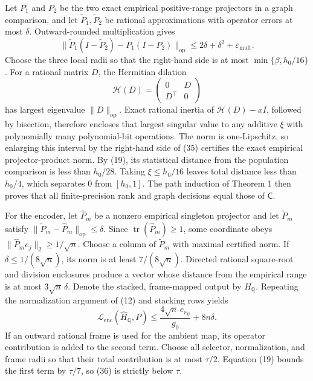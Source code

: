 Let \(P_1\) and \(P_2\) be the two exact empirical positive-range projectors in a graph comparison, and let \(\widetilde P_1,\widetilde P_2\) be rational approximations with operator errors at most \(\delta\).  Outward-rounded multiplication gives
\[
 \|\widetilde P_1(I-\widetilde P_2)-P_1(I-P_2)\|_{\mathrm{op}}
 \le2\delta+\delta^2+\varepsilon_{\mathrm{mult}}.
 \tag{35}
\]
Choose the three local radii so that the right-hand side is at most \(\min\{\beta,h_0/16\}\).  For a rational matrix \(D\), the Hermitian dilation
\[
 \mathcal H(D)=
 \begin{pmatrix}0&D\\D^{\top}&0\end{pmatrix}
\]
has largest eigenvalue \(\|D\|_{\mathrm{op}}\).  Exact rational inertia of \(\mathcal H(D)-xI\), followed by bisection, therefore encloses that largest singular value to any additive \(\xi\) with polynomially many polynomial-bit operations.  The norm is one-Lipschitz, so enlarging this interval by the right-hand side of (35) certifies the exact empirical projector-product norm.  By (19), its statistical distance from the population comparison is less than \(h_0/28\).  Taking \(\xi\le h_0/16\) leaves total distance less than \(h_0/4\), which separates \(0\) from \([h_0,1]\).  The path induction of Theorem 1 then proves that all finite-precision rank and graph decisions equal those of \(\mathsf C\).

For the encoder, let \(\widehat P_m\) be a nonzero empirical singleton projector and let \(\widetilde P_m\) satisfy \(\|\widetilde P_m-\widehat P_m\|_{\mathrm{op}}\le\delta\).  Since \(\operatorname{tr}(\widehat P_m)\ge1\), some coordinate obeys \(\|\widehat P_me_j\|_2\ge1/\sqrt n\).  Choose a column of \(\widetilde P_m\) with maximal certified norm.  If \(\delta\le1/(8\sqrt n)\), its norm is at least \(7/(8\sqrt n)\).  Directed rational square-root and division enclosures produce a vector whose distance from the empirical range is at most \(3\sqrt n\,\delta\).  Denote the stacked, frame-mapped output by \(\widehat H_{\mathbb Q}\).  Repeating the normalization argument of (12) and stacking rows yields
\[
 \mathcal L_{\mathrm{enc}}(\widehat H_{\mathbb Q},P)
 \le\frac{4\sqrt n\,e_{r_B}}{g_0}+8n\delta.
 \tag{36}
\]
If an outward rational frame is used for the ambient map, its operator contribution is added to the second term.  Choose all selector, normalization, and frame radii so that their total contribution is at most \(\tau/2\).  Equation (19) bounds the first term by \(\tau/7\), so (36) is strictly below \(\tau\).

